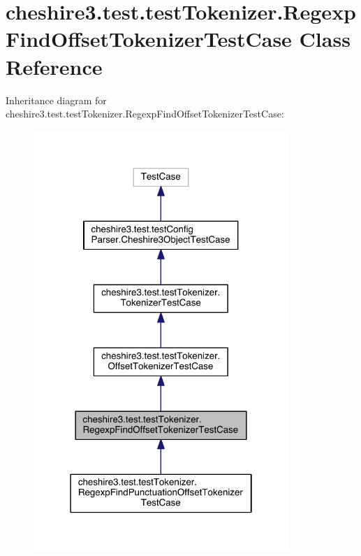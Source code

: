 \hypertarget{classcheshire3_1_1test_1_1test_tokenizer_1_1_regexp_find_offset_tokenizer_test_case}{\section{cheshire3.\-test.\-test\-Tokenizer.\-Regexp\-Find\-Offset\-Tokenizer\-Test\-Case Class Reference}
\label{classcheshire3_1_1test_1_1test_tokenizer_1_1_regexp_find_offset_tokenizer_test_case}
}


Inheritance diagram for cheshire3.\-test.\-test\-Tokenizer.\-Regexp\-Find\-Offset\-Tokenizer\-Test\-Case\-:
\nopagebreak
\begin{figure}[H]
\begin{center}
\leavevmode
\includegraphics[width=274pt]{classcheshire3_1_1test_1_1test_tokenizer_1_1_regexp_find_offset_tokenizer_test_case__inherit__graph}
\end{center}
\end{figure}


